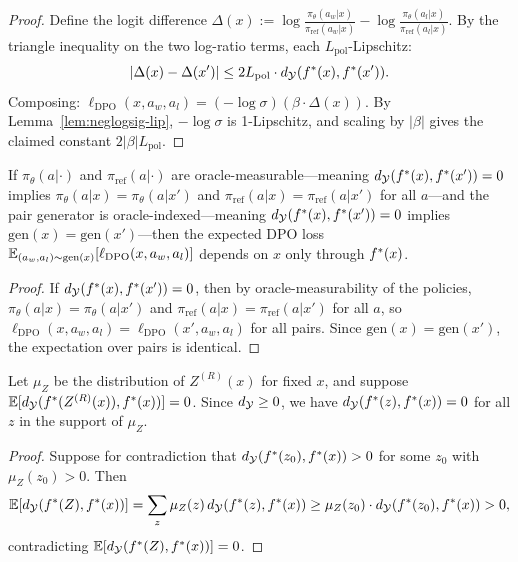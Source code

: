\begin{proof}
Define the logit difference $\Delta(x) := \log\frac{\pi_\theta(a_w|x)}{\pi_{\mathrm{ref}}(a_w|x)} - \log\frac{\pi_\theta(a_l|x)}{\pi_{\mathrm{ref}}(a_l|x)}$. By the triangle inequality on the two log-ratio terms, each $L_{\mathrm{pol}}$-Lipschitz:
\[
|\Delta(x) - \Delta(x')| \le 2 L_{\mathrm{pol}} \cdot d_{\mathcal{Y}}(f^\ast(x), f^\ast(x')).
\]
Composing: $\ell_{\mathrm{DPO}}(x, a_w, a_l) = (-\log\sigma)(\beta \cdot \Delta(x))$. By Lemma~\ref{lem:neglogsig-lip}, $-\log\sigma$ is 1-Lipschitz, and scaling by $|\beta|$ gives the claimed constant $2|\beta| L_{\mathrm{pol}}$.
\end{proof}

\begin{lemma}\label{lem:dpo-oracle-meas}
If $\pi_\theta(a|\cdot)$ and $\pi_{\mathrm{ref}}(a|\cdot)$ are oracle-measurable---meaning $d_{\mathcal{Y}}(f^\ast(x), f^\ast(x')) = 0$ implies $\pi_\theta(a|x) = \pi_\theta(a|x')$ and $\pi_{\mathrm{ref}}(a|x) = \pi_{\mathrm{ref}}(a|x')$ for all $a$---and the pair generator is oracle-indexed---meaning $d_{\mathcal{Y}}(f^\ast(x), f^\ast(x')) = 0$ implies $\mathrm{gen}(x) = \mathrm{gen}(x')$---then the expected DPO loss $\mathbb{E}_{(a_w,a_l) \sim \mathrm{gen}(x)}[\ell_{\mathrm{DPO}}(x, a_w, a_l)]$ depends on $x$ only through $f^\ast(x)$.
\end{lemma}

\begin{proof}
If $d_{\mathcal{Y}}(f^\ast(x), f^\ast(x')) = 0$, then by oracle-measurability of the policies, $\pi_\theta(a|x) = \pi_\theta(a|x')$ and $\pi_{\mathrm{ref}}(a|x) = \pi_{\mathrm{ref}}(a|x')$ for all $a$, so $\ell_{\mathrm{DPO}}(x, a_w, a_l) = \ell_{\mathrm{DPO}}(x', a_w, a_l)$ for all pairs. Since $\mathrm{gen}(x) = \mathrm{gen}(x')$, the expectation over pairs is identical.
\end{proof}

\begin{lemma}\label{lem:zero-dist-support}
Let $\mu_Z$ be the distribution of $Z^{(R)}(x)$ for fixed $x$, and suppose $\mathbb{E}[d_{\mathcal{Y}}(f^\ast(Z^{(R)}(x)), f^\ast(x))] = 0$. Since $d_{\mathcal{Y}} \ge 0$, we have $d_{\mathcal{Y}}(f^\ast(z), f^\ast(x)) = 0$ for all $z$ in the support of $\mu_Z$.
\end{lemma}

\begin{proof}
Suppose for contradiction that $d_{\mathcal{Y}}(f^\ast(z_0), f^\ast(x)) > 0$ for some $z_0$ with $\mu_Z(z_0) > 0$. Then
\[
\mathbb{E}[d_{\mathcal{Y}}(f^\ast(Z), f^\ast(x))] = \sum_z \mu_Z(z)\,d_{\mathcal{Y}}(f^\ast(z), f^\ast(x)) \ge \mu_Z(z_0) \cdot d_{\mathcal{Y}}(f^\ast(z_0), f^\ast(x)) > 0,
\]
contradicting $\mathbb{E}[d_{\mathcal{Y}}(f^\ast(Z), f^\ast(x))] = 0$.
\end{proof}

